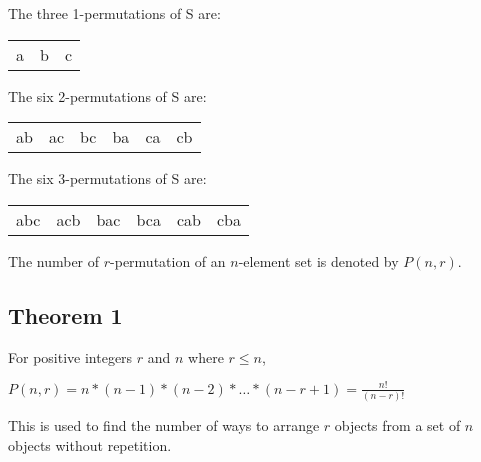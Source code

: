 \documentclass[12pt, letterpaper]{article}
\begin{document}
\begin{center}
  The three 1-permutations of S are: \\
  \begin{tabular}{c c c}
    a & b & c \\
  \end{tabular}

  The six 2-permutations of S are: \\
  \begin{tabular}{c c c c c c}
    ab & ac & bc & ba & ca & cb \\
  \end{tabular}

  The six 3-permutations of S are: \\
  \begin{tabular}{c c c c c c}
    abc & acb & bac & bca & cab & cba \\
  \end{tabular}
\end{center} 

\noindent The number of \(r\)-permutation of an \(n\)-element set is denoted by \(P(n, r)\).

\subsection*{Theorem 1}

For positive integers \(r\) and \(n\) where \(r \leq n\),
\begin{center}
  \(P(n, r) = n * (n-1) *(n-2) * \dots * (n-r+1) = \frac{n!}{(n-r)!}\) \\
\end{center}

\noindent This is used to find the number of ways to arrange \(r\) objects from a set of \(n\) objects without repetition. \\
\end{document}
